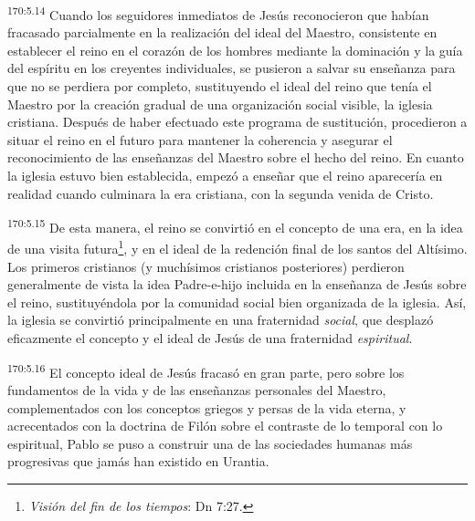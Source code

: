 \par 
\textsuperscript{170:5.14} Cuando los seguidores inmediatos de Jesús reconocieron que habían fracasado parcialmente en la realización del ideal del Maestro, consistente en establecer el reino en el corazón de los hombres mediante la dominación y la guía del espíritu en los creyentes individuales, se pusieron a salvar su enseñanza para que no se perdiera por completo, sustituyendo el ideal del reino que tenía el Maestro por la creación gradual de una organización social visible, la iglesia cristiana. Después de haber efectuado este programa de sustitución, procedieron a situar el reino en el futuro para mantener la coherencia y asegurar el reconocimiento de las enseñanzas del Maestro sobre el hecho del reino. En cuanto la iglesia estuvo bien establecida, empezó a enseñar que el reino aparecería en realidad cuando culminara la era cristiana, con la segunda venida de Cristo.

\par 
\textsuperscript{170:5.15} De esta manera, el reino se convirtió en el concepto de una era, en la idea de una visita futura\footnote{\textit{Visión del fin de los tiempos}: Dn 7:27.}, y en el ideal de la redención final de los santos del Altísimo. Los primeros cristianos (y muchísimos cristianos posteriores) perdieron generalmente de vista la idea Padre-e-hijo incluida en la enseñanza de Jesús sobre el reino, sustituyéndola por la comunidad social bien organizada de la iglesia. Así, la iglesia se convirtió principalmente en una fraternidad \textit{social}, que desplazó eficazmente el concepto y el ideal de Jesús de una fraternidad \textit{espiritual}.

\par 
\textsuperscript{170:5.16} El concepto ideal de Jesús fracasó en gran parte, pero sobre los fundamentos de la vida y de las enseñanzas personales del Maestro, complementados con los conceptos griegos y persas de la vida eterna, y acrecentados con la doctrina de Filón sobre el contraste de lo temporal con lo espiritual, Pablo se puso a construir una de las sociedades humanas más progresivas que jamás han existido en Urantia.

